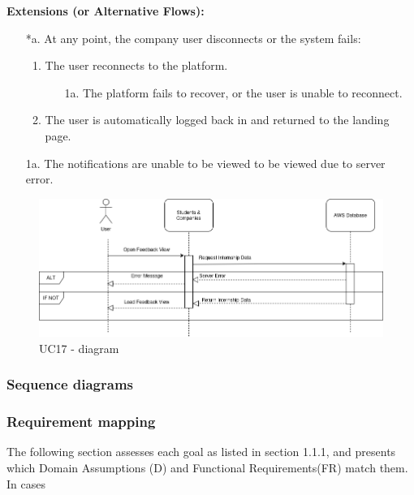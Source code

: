 \begin{itemize}[label={[\textbf{UC}]}, align=left, leftmargin=*]
    \textbf{Extensions (or Alternative Flows):} 
    \begin{enumerate}[label=\arabic*.]
        \item[*a.] At any point, the company user disconnects or the system fails:
            \begin{enumerate}[label=\arabic*.]
                \item The user reconnects to the platform.
                    \begin{enumerate}[label=\alph*.]
                        \item[1a.] The platform fails to recover, or the user is unable to reconnect.
                    \end{enumerate}
                 \item The user is automatically logged back in and returned to the landing page.
            \end{enumerate}
        \item[1a.] The notifications are unable to be viewed to be viewed due to server error.
        \end{enumerate}
\end{itemize}


     \begin{figure}[H]
    	\includegraphics[width=\textwidth,height=\textheight,keepaspectratio]{RASD-Latex/assets/Use Case Diagrams/UC17.png}
    	\caption{UC17 - diagram}
    	\label{fig:DataRequest}
    \end{figure}



\subsubsection{Sequence diagrams}
\subsubsection{Requirement mapping}
The following section assesses each goal as listed in section 1.1.1, and presents which Domain Assumptions (D) and Functional Requirements(FR) match them. In cases 

